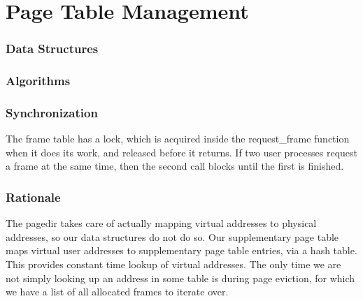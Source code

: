 \part{Page Table Management}

\section{Data Structures}


\section{Algorithms}



\section{Synchronization}


The frame table has a lock, which is acquired inside the request\_frame
function when it does its work, and released before it returns. If two user
processes request a frame at the same time, then the second call blocks
until the first is finished.

\section{Rationale}


The pagedir takes care of actually mapping virtual addresses to physical
addresses, so our data structures do not do so. Our supplementary page table
maps virtual user addresses to supplementary page table entries, via a hash
table. This provides constant time lookup of virtual addresses. The only
time we are not simply looking up an address in some table is during page
eviction, for which we have a list of all allocated frames to iterate over.
